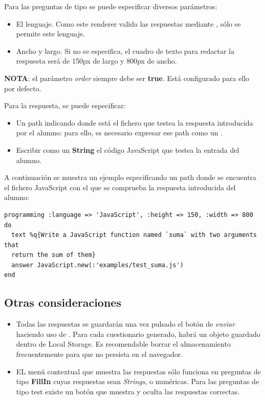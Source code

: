 Para las preguntas de tipo  se puede especificar diversos par\'ametros:
\begin{itemize}
  \item El lenguaje. Como este renderer valida las respuestas mediante , s\'olo se permite este lenguaje.
  \item Ancho y largo. Si no se especifica, el cuadro de texto para redactar la respuesta ser\'a de 150px de largo y 800px de ancho.
\end{itemize}

{\bfseries NOTA}: el par\'ametro \textit{order} siempre debe ser {\bfseries true}. Est\'a configurado para ello por defecto.
\bigskip
\bigskip

Para la respuesta, se puede especificar: 
\begin{itemize}
  \item Un path indicando donde est\'a el fichero que testea la respuesta introducida por el alumno: para ello, es necesario expresar ese path como un .
  \item Escribir como un {\bfseries String} el c\'odigo JavaScript que testea la entrada del alumno.
\end{itemize}
\bigskip

A continuaci\'on se muestra un ejemplo especificando un path donde se encuentra el fichero JavaScript con el que se comprueba la respuesta introducida del alumno:
\begin{verbatim}
programming :language => 'JavaScript', :height => 150, :width => 800  do
  text %q{Write a JavaScript function named `suma` with two arguments that
  return the sum of them}
  answer JavaScript.new(:'examples/test_suma.js')
end
\end{verbatim}

\subsection{Otras consideraciones}
\label{subsec:Apendice2.9}

\begin{itemize}
  \item Todas las respuestas se guardar\'an una vez pulsado el bot\'on de \textit{enviar} haciendo uso de . Para cada cuestionario generado, habr\'a 
  un objeto guardado dentro de Local Storage. Es recomendable borrar el almacenamiento frecuentemente para que no persista en el navegador.
  \item EL men\'u contextual que muestra las respuestas s\'olo funciona en preguntas de tipo {\bfseries FillIn} cuyas respuestas sean \textit{Strings},  o num\'ericas.
  Para las preguntas de tipo test existe un bot\'on que muestra y oculta las respuestas correctas.
\end{itemize}

